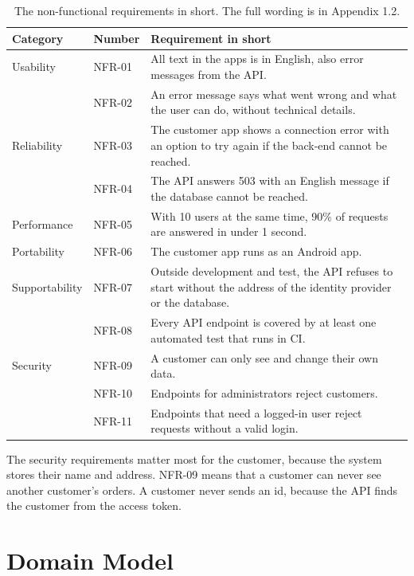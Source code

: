 \begin{table}[H]
    \centering
    \begin{tabular}{@{}p{2.6cm} p{1.6cm} p{10cm}@{}}
        \hline
        Category & Number & Requirement in short \\
        \hline
        Usability & NFR-01 & All text in the apps is in English, also error messages from the API. \\
                  & NFR-02 & An error message says what went wrong and what the user can do, without technical details. \\
        Reliability & NFR-03 & The customer app shows a connection error with an option to try again if the back-end cannot be reached. \\
                    & NFR-04 & The API answers 503 with an English message if the database cannot be reached. \\
        Performance & NFR-05 & With 10 users at the same time, 90\% of requests are answered in under 1 second. \\
        Portability & NFR-06 & The customer app runs as an Android app. \\
        Supportability & NFR-07 & Outside development and test, the API refuses to start without the address of the identity provider or the database. \\
                       & NFR-08 & Every API endpoint is covered by at least one automated test that runs in CI. \\
        Security & NFR-09 & A customer can only see and change their own data. \\
                 & NFR-10 & Endpoints for administrators reject customers. \\
                 & NFR-11 & Endpoints that need a logged-in user reject requests without a valid login. \\
        \hline
    \end{tabular}
    \caption{The non-functional requirements in short. The full wording is in Appendix 1.2.}
    \label{tab:nfr}
\end{table}

The security requirements matter most for the customer, because the system stores
their name and address. NFR-09 means that a customer can never see another customer's
orders. A customer never sends an id, because the API finds the customer from the
access token.

\section{Domain Model}\label{sec:req-domain-model}

